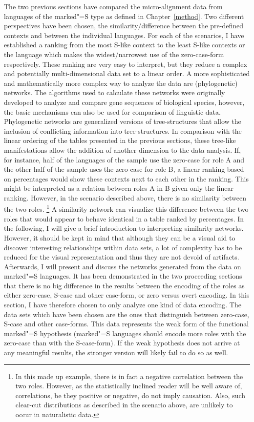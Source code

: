 The two previous sections have compared the micro-alignment data from languages of the marked"=S type as defined in Chapter~\ref{method}.
Two different perspectives have been chosen, the similarity/difference between the pre-defined contexts and between the individual languages. 
For each of the scenarios, I have established a ranking from the most S-like context to the least S-like contexts or the language which makes the widest/narrowest use of the zero-case-form respectively.
These ranking are very easy to interpret, but they reduce a complex and potentially multi-dimensional data set to a linear order.
A more sophisticated and mathematically more complex way to analyze the data are (phylogenetic) networks.
The algorithms used to calculate these networks were originally developed to analyze and compare gene sequences of biological species, however, the basic mechanisms can also be used for comparison of linguistic data. 
Phylogenetic networks are generalized versions of tree-structures that allow the inclusion of conflicting information into tree-structures.
In comparison with the linear ordering of the tables presented in the previous sections, these tree-like manifestations allow the addition of another dimension to the data analysis.
If, for instance, half of the languages of the sample use the zero-case for role A and the other half of the sample uses the zero-case for role B, a linear ranking based on percentages would show these contexts next to each other in the ranking. 
This might be interpreted as a relation between roles A in B given only the linear ranking. 
However, in the scenario described above, there is no similarity between the two roles.
\footnote{In this made up example, there is in fact a negative correlation between the two roles. However, as the statistically inclined reader will be well aware of, correlations, be they positive or negative, do not imply causation. 
Also, such clear-cut distributions as described in the scenario above, are unlikely to occur in naturalistic data.} 
A similarity network can visualize this difference between the two roles that would appear to behave identical in a table ranked by percentages.
In the following, I will give a brief introduction to interpreting similarity networks. 
However, it should be kept in mind that although they can be a visual aid to discover interesting relationships within data sets, a lot of complexity has to be reduced for the visual representation and thus they are not devoid of artifacts.  
Afterwards, I will present and discuss the networks generated from the data on marked"=S languages. 
It has been demonstrated in the two proceeding sections that there is no big difference in the results between the encoding of the roles as either zero-case, S-case and other case-form, or zero versus overt encoding. 
In this section, I have therefore chosen to only analyze one kind of data encoding. 
The data sets which have been chosen are the ones that distinguish between zero-case, S-case and other case-forms. 
This data represents the weak form of the functional marked"=S hypothesis (marked"=S languages should encode more roles with the zero-case than with the S-case-form). 
If the weak hypothesis does not arrive at any meaningful results, the stronger version will likely fail to do so as well. 

